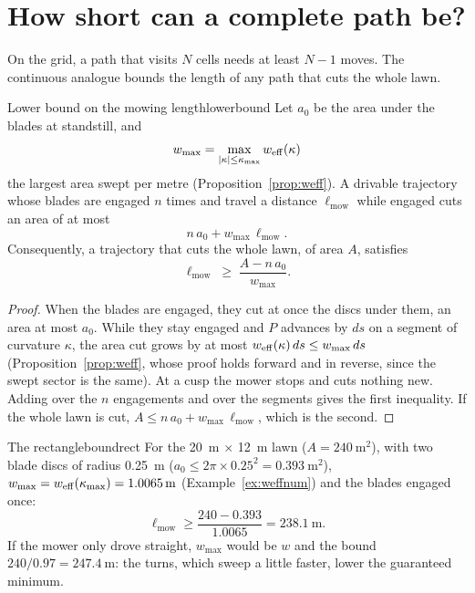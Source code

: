 \section{How short can a complete path be?}

On the grid, a path that visits $N$ cells needs at least $N - 1$ moves. The
continuous analogue bounds the length of any path that cuts the whole lawn.

\begin{theorem}{Lower bound on the mowing length}{lowerbound}
  Let $a_0$ be the area under the blades at standstill, and
  \[
    w_{\max} = \max_{|\kappa| \le \kappa_{\max}} w_{\mathrm{eff}}(\kappa)
  \]
  the largest area swept per metre (Proposition~\ref{prop:weff}). A
  drivable trajectory whose blades are engaged $n$ times and travel a
  distance $\ell_{\mathrm{mow}}$ while engaged cuts an area of at most
  \[
    n\,a_0 + w_{\max}\,\ell_{\mathrm{mow}} .
  \]
  Consequently, a trajectory that cuts the whole lawn, of area $A$, satisfies
  \[
    \ell_{\mathrm{mow}} \;\ge\; \frac{A - n\,a_0}{w_{\max}} .
  \]
\end{theorem}

\begin{proof}
  When the blades are engaged, they cut at once the discs under them, an
  area at most $a_0$. While they stay engaged and $P$ advances by $ds$ on a
  segment of curvature $\kappa$, the area cut grows by at most
  $w_{\mathrm{eff}}(\kappa)\,ds \le w_{\max}\,ds$ (Proposition~\ref{prop:weff}, whose
  proof holds forward and in reverse, since the swept sector is the same).
  At a cusp the mower stops and cuts nothing new. Adding over the $n$
  engagements and over the segments gives the first inequality. If the whole
  lawn is cut, $A \le n\,a_0 + w_{\max}\,\ell_{\mathrm{mow}}$, which is the
  second.
\end{proof}

\begin{example}{The rectangle}{boundrect}
  For the \SI{20}{\metre} $\times$ \SI{12}{\metre} lawn ($A =
  \SI{240}{\metre\squared}$), with two blade discs of radius
  \SI{0.25}{\metre} ($a_0 \le 2\pi \times 0.25^2 = \SI{0.393}{\metre
  \squared}$), $w_{\max} = w_{\mathrm{eff}}(\kappa_{\max}) = \SI{1.0065}{\metre}$
  (Example~\ref{ex:weffnum}) and the blades engaged once:
  \[
    \ell_{\mathrm{mow}} \ge \frac{240 - 0.393}{1.0065}
    = \SI{238.1}{\metre}.
  \]
  If the mower only drove straight, $w_{\max}$ would be $w$ and the bound
  $240/0.97 = \SI{247.4}{\metre}$: the turns, which sweep a little faster,
  lower the guaranteed minimum.
\end{example}

